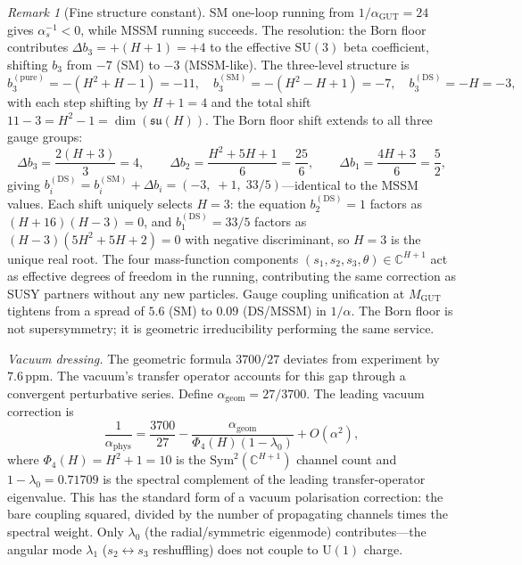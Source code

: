 \documentclass[11pt,a4paper]{article}
\theoremstyle{definition}
\theoremstyle{remark}
\newtheorem{remark}[theorem]{Remark}
\newcommand{\C}{\mathbb{C}}
\newcommand{\SU}{\mathrm{SU}}
\newcommand{\su}{\mathfrak{su}}
\newcommand{\Sym}{\mathrm{Sym}}
\begin{document}
\begin{remark}[Fine structure constant]
SM one-loop running from $1/\alpha_\mathrm{GUT}=24$ gives $\alpha_s^{-1}<0$, while MSSM running succeeds. The resolution: the Born floor contributes $\Delta b_3=+(H+1)=+4$ to the effective $\SU(3)$ beta coefficient, shifting $b_3$ from $-7$ (SM) to $-3$ (MSSM-like). The three-level structure is
\begin{equation}\label{eq:beta_levels}
b_3^{(\mathrm{pure})}=-(H^2\!+\!H\!-\!1)=-11,\quad b_3^{(\mathrm{SM})}=-(H^2\!-\!H\!+\!1)=-7,\quad b_3^{(\mathrm{DS})}=-H=-3,
\end{equation}
with each step shifting by $H+1=4$ and the total shift $11-3=H^2-1=\dim(\su(H))$. The Born floor shift extends to all three gauge groups:
\begin{equation}\label{eq:ew_beta}
\Delta b_3=\frac{2(H+3)}{3}=4,\qquad \Delta b_2=\frac{H^2+5H+1}{6}=\frac{25}{6},\qquad \Delta b_1=\frac{4H+3}{6}=\frac{5}{2},
\end{equation}
giving $b_i^{(\mathrm{DS})}=b_i^{(\mathrm{SM})}+\Delta b_i=(-3,\;+1,\;33/5)$---identical to the MSSM values. Each shift uniquely selects $H=3$: the equation $b_2^{(\mathrm{DS})}=1$ factors as $(H+16)(H-3)=0$, and $b_1^{(\mathrm{DS})}=33/5$ factors as $(H-3)(5H^2+5H+2)=0$ with negative discriminant, so $H=3$ is the unique real root. The four mass-function components $(s_1,s_2,s_3,\theta)\in\C^{H+1}$ act as effective degrees of freedom in the running, contributing the same correction as SUSY partners without any new particles. Gauge coupling unification at $M_\mathrm{GUT}$ tightens from a spread of $5.6$ (SM) to $0.09$ (DS/MSSM) in $1/\alpha$. The Born floor is not supersymmetry; it is geometric irreducibility performing the same service.

\emph{Vacuum dressing.} The geometric formula $3700/27$ deviates from experiment by $7.6\,\mathrm{ppm}$. The vacuum's transfer operator accounts for this gap through a convergent perturbative series. Define $\alpha_{\mathrm{geom}}=27/3700$. The leading vacuum correction is
\begin{equation}\label{eq:alpha_dressed}
\frac{1}{\alpha_{\mathrm{phys}}} = \frac{3700}{27} - \frac{\alpha_{\mathrm{geom}}}{\Phi_4(H)(1-\lambda_0)} + O(\alpha^2),
\end{equation}
where $\Phi_4(H)=H^2+1=10$ is the $\Sym^2(\C^{H+1})$ channel count and $1-\lambda_0=0.71709$ is the spectral complement of the leading transfer-operator eigenvalue. This has the standard form of a vacuum polarisation correction: the bare coupling squared, divided by the number of propagating channels times the spectral weight. Only $\lambda_0$ (the radial/symmetric eigenmode) contributes---the angular mode $\lambda_1$ ($s_2\leftrightarrow s_3$ reshuffling) does not couple to $\mathrm{U}(1)$ charge.


\end{remark}
\end{document}
